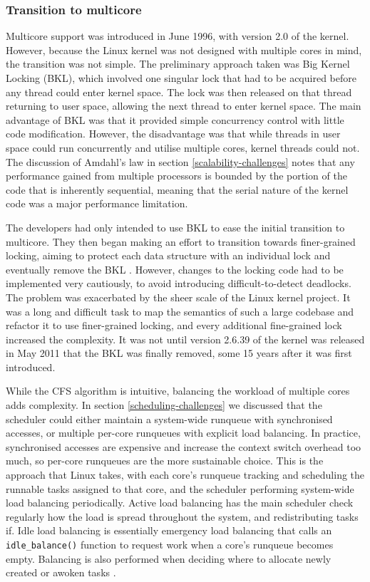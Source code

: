 \documentclass[bsc,frontabs,twoside,singlespacing,parskip,deptreport]{infthesis}     %
\begin{document}
\subsubsection{Transition to multicore} \label{transition-to-multicore}
Multicore support was introduced in June 1996, with version 2.0 of the kernel. However, because the Linux kernel was not designed with multiple cores in mind, the transition was not simple. The preliminary approach taken was Big Kernel Locking (BKL), which involved one singular lock that had to be acquired before any thread could enter kernel space. The lock was then released on that thread returning to user space, allowing the next thread to enter kernel space. The main advantage of BKL was that it provided simple concurrency control with little code modification. However, the disadvantage was that while threads in user space could run concurrently and utilise multiple cores, kernel threads could not. The discussion of Amdahl's law in section \ref{scalability-challenges} notes that any performance gained from multiple processors is bounded by the portion of the code that is inherently sequential, meaning that the serial nature of the kernel code was a major performance limitation.

The developers had only intended to use BKL to ease the initial transition to multicore. They then began making an effort to transition towards finer-grained locking, aiming to protect each data structure with an individual lock and eventually remove the BKL \cite{locking-smp-kernels}. However, changes to the locking code had to be implemented very cautiously, to avoid introducing difficult-to-detect deadlocks. The problem was exacerbated by the sheer scale of the Linux kernel project.  It was a long and difficult task to map the semantics of such a large codebase and refactor it to use finer-grained locking, and every additional fine-grained lock increased the complexity. It was not until version 2.6.39 of the kernel was released in May 2011 that the BKL was finally removed, some 15 years after it was first introduced. 

While the CFS algorithm is intuitive, balancing the workload of multiple cores adds complexity. In section \ref{scheduling-challenges} we discussed that the scheduler could either maintain a system-wide runqueue with synchronised accesses, or multiple per-core runqueues with explicit load balancing. In practice, synchronised accesses are expensive and increase the context switch overhead too much, so per-core runqueues are the more sustainable choice. This is the approach that Linux takes, with each core's runqueue tracking and scheduling the runnable tasks assigned to that core, and the scheduler performing system-wide load balancing periodically. Active load balancing has the main scheduler check regularly how the load is spread throughout the system, and redistributing tasks if. Idle load balancing is essentially emergency load balancing that calls an \verb|idle_balance()| function to request work when a core's runqueue becomes empty. Balancing is also performed when deciding where to allocate newly created or awoken tasks \cite{seeker}. 
\end{document}

